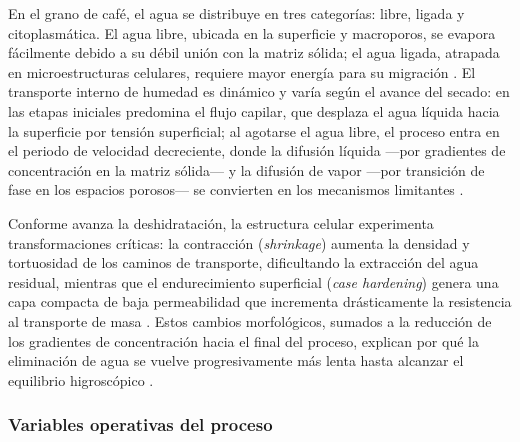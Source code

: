 En el grano de café, el agua se distribuye en tres categorías: libre, ligada y 
citoplasmática. El agua libre, ubicada en la superficie y macroporos, se evapora 
fácilmente debido a su débil unión con la matriz sólida; el agua ligada, atrapada 
en microestructuras celulares, requiere mayor energía para su migración 
\parencite{abidin_improving_2024, alves_physiological_2017}. El transporte interno 
de humedad es dinámico y varía según el avance del secado: en las etapas iniciales 
predomina el flujo capilar, que desplaza el agua líquida hacia la superficie por 
tensión superficial; al agotarse el agua libre, el proceso entra en el periodo de 
velocidad decreciente, donde la difusión líquida —por gradientes de concentración 
en la matriz sólida— y la difusión de vapor —por transición de fase en los espacios 
porosos— se convierten en los mecanismos limitantes 
\parencite{kilic_preservation_2024, yu_current_2025, fernando_effect_2025, 
geng_thermodynamically_2023, hadibi_effect_2025}.

Conforme avanza la deshidratación, la estructura celular experimenta transformaciones 
críticas: la contracción (\textit{shrinkage}) aumenta la densidad y tortuosidad de 
los caminos de transporte, dificultando la extracción del agua residual, mientras 
que el endurecimiento superficial (\textit{case hardening}) genera una capa compacta 
de baja permeabilidad que incrementa drásticamente la resistencia al transporte de 
masa \parencite{kilic_preservation_2024, abidin_improving_2024, 
tejeda-miramontes_phase-segmented_2025, liu_optimization_2025}. Estos cambios 
morfológicos, sumados a la reducción de los gradientes de concentración hacia el 
final del proceso, explican por qué la eliminación de agua se vuelve progresivamente 
más lenta hasta alcanzar el equilibrio higroscópico 
\parencite{amaral_simulation_2018, yu_current_2025}.

\subsubsection{Variables operativas del proceso}

